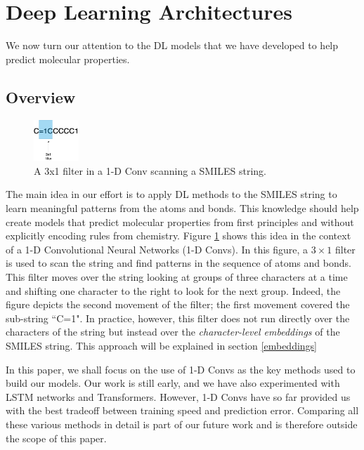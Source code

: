 \section{Deep Learning Architectures \label{archi}}
We now turn our attention to the DL models that we have developed to help predict molecular properties.
\subsection{Overview}
    \begin{figure}[htbp]
        \centering
        \includegraphics[width=0.15\textwidth]{figures/convonsmiles.png}
        \caption{A 3x1 filter in a 1-D Conv scanning a SMILES string. }
        \label{fig:conv-filter}
    \end{figure}
The main idea in our effort is to apply DL methods to the SMILES string to learn meaningful patterns from the atoms and bonds. This knowledge should help create models that predict molecular properties from first principles and without explicitly encoding rules from chemistry. Figure \ref{fig:conv-filter} shows this idea in the context of a 1-D Convolutional Neural Networks (1-D Convs). In this figure, a $3 \times 1$ filter is used to scan the string and find patterns in the sequence of atoms and bonds. This filter moves over the string looking at groups of three characters at a time and shifting one character to the right to look for the next group. Indeed, the figure depicts the second movement of the filter; the first movement covered the sub-string ``C=1".  In practice, however, this filter does not run directly over the characters of the string but instead  over the {\em character-level embeddings}  of the SMILES string. This approach will be explained in section \ref{embeddings}


In this paper, we shall focus on the use of 1-D Convs as the key methods used to build our models. Our work is still early, and we have also experimented with LSTM networks and Transformers. However,  1-D Convs have so far provided us with the best tradeoff between training speed and prediction error. Comparing all these various methods in detail is part of our future work and is therefore outside the scope of this paper. 


